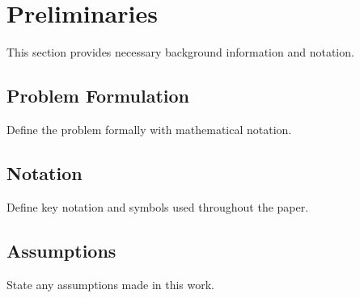 \section{Preliminaries}
\label{sec:prelim}

This section provides necessary background information and notation.

\subsection{Problem Formulation}
Define the problem formally with mathematical notation.

\subsection{Notation}
Define key notation and symbols used throughout the paper.

\subsection{Assumptions}
State any assumptions made in this work.
